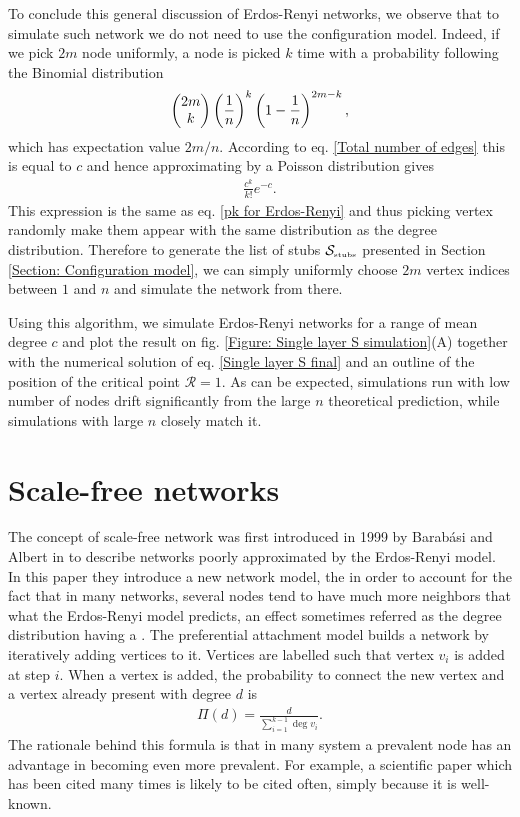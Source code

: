 \documentclass[
11pt, %
american, %
singlespacing, %
final, %
nolistspacing, %
liststotoc, %
headsepline, %
]{MastersDoctoralThesis} %
\begin{document}
To conclude this general discussion of Erdos-Renyi networks, we observe that to simulate such network we do not need to use the configuration model. Indeed, if we pick $2 m$ node uniformly, a node is picked $k$ time with a probability following the Binomial distribution
\begin{align}
	\begin{pmatrix} 2m \\ k \end{pmatrix} \left(\frac{1}{n}\right)^k \left(1 - \frac{1}{n}\right)^{2 m - k},
\end{align}
which has expectation value $2 m/n$. According to eq. \eqref{Total number of edges} this is equal to $c$ and hence approximating by a Poisson distribution gives
\begin{align}
	\frac{c^k}{k!} e^{-c}.
\end{align}
This expression is the same as eq. \eqref{pk for Erdos-Renyi} and thus picking vertex randomly make them appear with the same distribution as the degree distribution. Therefore to generate the list of stubs $\mathcal{S}_{\text{\tiny stubs}}$ presented in Section \ref{Section: Configuration model}, we can simply uniformly choose $2m$ vertex indices between $1$ and $n$ and simulate the network from there.

Using this algorithm, we simulate Erdos-Renyi networks for a range of mean degree $c$ and plot the result on fig. \ref{Figure: Single layer S simulation}(A) together with the numerical solution of eq. \eqref{Single layer S final} and an outline of the position of the critical point $\mathcal{R} = 1$. As can be expected, simulations run with low number of nodes drift significantly from the large $n$ theoretical prediction, while simulations with large $n$ closely match it.

\section{Scale-free networks}
\label{Section: Scale-free networks}

The concept of scale-free network was first introduced in 1999 by Barabási and Albert in \cite{barabasi1999emergence} to describe networks poorly approximated by the Erdos-Renyi model. In this paper they introduce a new network model, the  in order to account for the fact that in many networks, several nodes tend to have much more neighbors that what the Erdos-Renyi model predicts, an effect sometimes referred as the degree distribution having a . The preferential attachment model builds a network by iteratively adding vertices to it. Vertices are labelled such that vertex $v_i$ is added at step $i$. When a vertex is added, the probability to connect the new vertex and a vertex already present with degree $d$ is
\begin{align}
	\Pi(d) = \frac{d}{\sum_{i=1}^{k - 1} \deg{v_i}}. \label{Preferential attachment probability}
\end{align}
The rationale behind this formula is that in many system a prevalent node has an advantage in becoming even more prevalent. For example, a scientific paper which has been cited many times is likely to be cited often, simply because it is well-known.
\end{document}

